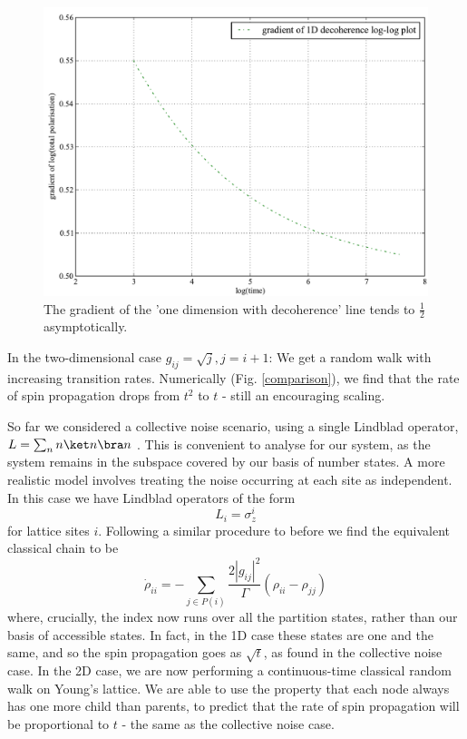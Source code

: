 \begin{figure}
  \begin{center}
    \includegraphics[scale=0.6]{assets/asymptotic_1d.pdf}
  \end{center}
  \caption{ The gradient of the 'one dimension with decoherence' line tends to $\frac{1}{2}$ asymptotically.}
  \label{asymptotic_1d}
\end{figure}

In the two-dimensional case $g_{ij} = \sqrt{j}, j=i+1$: We get a random walk with increasing transition rates. Numerically (Fig. \ref{comparison}), we find that the rate of spin propagation drops from $t^2$ to $t$ - still an encouraging scaling.


So far we considered a collective noise scenario, using a single Lindblad operator, $ L=\sum_{n}n\ket n\bra n$ . This is convenient to analyse for our system, as the system remains in the subspace covered by our basis of number states. A more realistic model involves treating the noise occurring at each site as independent. In this case we have Lindblad operators of the form
\begin{equation}
  L_i = \sigma_z^i
\end{equation}
for lattice sites $i$. Following a similar procedure to before we find the equivalent classical chain to be
\begin{equation}
  \dot{\rho}_{ii}=-\sum_{j\in
  P(i)}\frac{2|g_{ij}|^{2}}{\Gamma}\left(\rho_{ii}-\rho_{jj}\right)
  \label{qmat}
\end{equation}
where, crucially, the index now runs over all the partition states, rather than our basis of accessible states. In fact, in the 1D case these states are one and the same, and so the spin propagation goes as $\sqrt{t}$, as found in the collective noise case. In the 2D case, we are now performing a continuous-time classical random walk on Young's lattice. We are able to use the property that each node always has one more child than parents, to predict that the rate of spin propagation will be proportional to $t$ - the same as the collective noise case.  

